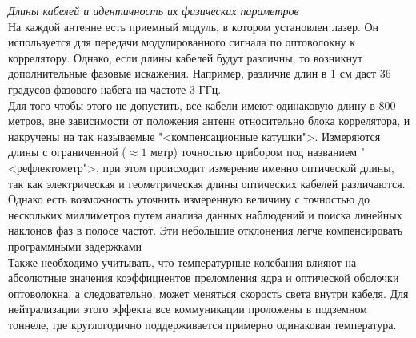 \begin{list}{-}{\textbf{Аппаратные}}
	\item \textit{Длины кабелей и идентичность их физических параметров}\\
	На каждой антенне есть приемный модуль, в котором установлен лазер. Он используется для передачи модулированного сигнала по оптоволокну к коррелятору. Однако, если длины кабелей будут различны, то возникнут дополнительные фазовые искажения. Например, различие длин в 1 см даст 36 градусов фазового набега на частоте 3 ГГц.\\
	Для того чтобы этого не допустить, все кабели имеют одинаковую длину в 800 метров, вне зависимости от положения антенн относительно блока коррелятора, и накручены на так называемые "<компенсационные катушки">. Измеряются длины с ограниченной ($\approx 1$ метр) точностью прибором под названием "<рефлектометр">, при этом происходит измерение именно оптической длины, так как электрическая и геометрическая длины оптических кабелей различаются.\\
	Однако есть возможность уточнить измеренную величину с точностью до нескольких миллиметров путем анализа данных наблюдений и поиска линейных наклонов фаз в полосе частот. Эти небольшие отклонения легче компенсировать программными задержками\\
	Также необходимо учитывать, что температурные колебания влияют на абсолютные значения коэффициентов преломления ядра и оптической оболочки оптоволокна, а следовательно, может меняться скорость света внутри кабеля. Для нейтрализации этого эффекта все коммуникации проложены в подземном тоннеле, где круглогодично поддерживается примерно одинаковая температура.


\end{list}

